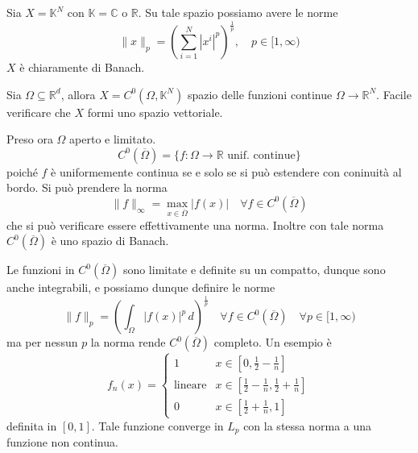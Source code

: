 \begin{example}{}
    Sia \(X = \mathbb{K}^{N}\) con \(\mathbb{K} = \mathbb{C}\) o
    \(\mathbb{R}\). Su tale spazio possiamo avere le norme
    \[
      \|x\|_p = {\left( \sum_{i=1}^{N} |x^{i}|^{p}  \right)}^{\frac{1}{p}},
      \quad p \in [1, \infty)
    \]
    \(X\) è chiaramente di Banach.
\end{example}
\begin{example}{}
    Sia \(\Omega \subseteq \mathbb{R}^{d} \), allora \(X = C^{0}{(\Omega,\mathbb{K}^{N})}\) spazio delle funzioni continue \(\Omega\to \mathbb{R}^{N}\). Facile verificare che \(X\) formi uno spazio vettoriale.

    Preso ora \(\Omega\) aperto e limitato. 
    \[
      C^{0}{(\overline{\Omega})} = \{f:\Omega\to \mathbb{R} \text{ unif.
      continue}\} 
    \]
    poiché \(f\) è uniformemente continua se e solo se si può estendere con coninuità al bordo.
    Si può prendere la norma
    \[
      \|f\|_{\infty} = \max_{x \in \overline{\Omega}} |f{(x)}| \quad \forall f
      \in C^{0}{(\overline{\Omega})}
    \]
    che si può verificare essere effettivamente una norma. Inoltre con tale
    norma \(C^{0}{(\overline{\Omega})}\) è uno spazio di Banach.

    Le funzioni in \(C^{0}{(\overline{\Omega})}\) sono limitate e definite su un
    compatto, dunque sono anche integrabili, e possiamo dunque definire le norme
    \[
        \|f\|_p = {\left( \int_{\Omega} |f{(x)}|^{p} \,d \right)}^{\frac{1}{p}}
        \quad \forall f \in C^{0}{(\overline{\Omega})} \quad \forall p \in [1,
        \infty)
    \]
    ma per nessun \(p\) la norma rende \(C^{0}{(\overline{\Omega})}\) completo.
    Un esempio è
    \[
      f_{n}{(x)} = \begin{cases}{}
          1 & x \in [0,\frac{1}{2} - \frac{1}{n}] \\
          \text{lineare} & x \in [\frac{1}{2} - \frac{1}{n}, \frac{1}{2}+\frac{1}{n}] \\
          0 & x \in [\frac{1}{2}+\frac{1}{n},1]
      \end{cases}
    \]
    definita in \([0,1]\). Tale funzione converge in \(L_p\) con la stessa norma a una funzione non
    continua.
\end{example}

